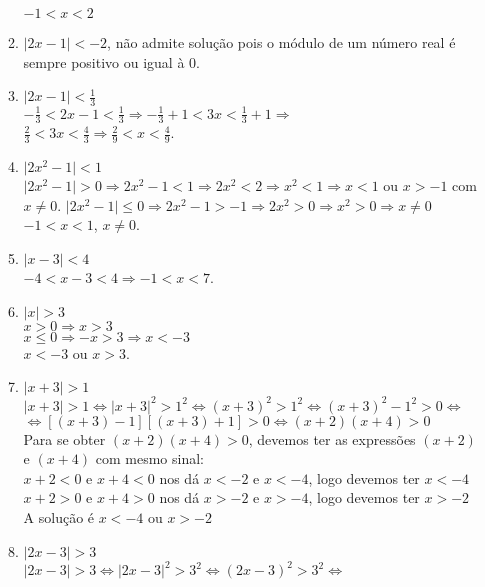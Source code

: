 \begin{enumerate}
\begin{enumerate}
		$-1 < x < 2$
		\item %
		$\vert 2x - 1 \vert < -2$, não admite solução pois o módulo de um número real é sempre positivo ou igual à 0.
		\item %
		$\vert 2x - 1 \vert < \frac{1}{3}$\\
		$-\frac{1}{3} < 2x - 1 < \frac{1}{3} \Rightarrow -\frac{1}{3} + 1 < 3x < \frac{1}{3} + 1 \Rightarrow$\\
		$\frac{2}{3} < 3x < \frac{4}{3} \Rightarrow \frac{2}{9} < x < \frac{4}{9}$.
		\item %
		$\vert 2x^2 - 1 \vert < 1$\\
		$\vert 2x^2 - 1 \vert > 0 \Rightarrow 2x^2 - 1 < 1 \Rightarrow 2x^2 < 2 \Rightarrow x^2 < 1 \Rightarrow x < 1$ ou $x > -1$ com $x \neq 0$.
		$\vert 2x^2 - 1 \vert \leq 0 \Rightarrow 2x^2 - 1 > -1 \Rightarrow 2x^2 > 0 \Rightarrow x^2 > 0 \Rightarrow x \neq 0$\\
		$-1 < x < 1$, $x \neq 0$.
		\item %
		$\vert x - 3 \vert < 4$\\
		$-4 <  x - 3 < 4 \Rightarrow -1 < x < 7$.
		\item %
		$\vert x \vert > 3$\\		
		$x > 0 \Rightarrow x > 3$\\
		$x \leq 0 \Rightarrow -x > 3 \Rightarrow x < -3$\\
		$x < -3$ ou $x > 3$.
		\item %
		$\vert x + 3 \vert > 1$\\
		$\vert x + 3 \vert > 1 \Leftrightarrow \vert x + 3\vert^2 > 1^2  \Leftrightarrow (x+3)^2 > 1^2 \Leftrightarrow (x+3)^2 - 1^2 > 0 \Leftrightarrow$\\
		$\Leftrightarrow [(x+3)-1][(x+3)+1]>0 \Leftrightarrow (x+2)(x+4)>0$\\
		Para se obter $(x+2)(x+4)>0$, devemos ter as expressões $(x+2)$ e $(x+4)$ com mesmo sinal:\\
		$x+2 < 0$ e $ x+4 < 0 $ nos dá $x < -2$ e $x < -4$, logo devemos ter $x < -4$\\
		$x+2 > 0$ e $ x+4 > 0 $ nos dá $x > -2$ e $x > -4$, logo devemos ter $x > -2$\\
		A solução é $x < -4$ ou $x > -2$
		\item %
		$\vert 2x - 3 \vert > 3$\\
		$\vert 2x - 3 \vert > 3 \Leftrightarrow \vert 2x - 3 \vert^2 > 3^2 \Leftrightarrow (2x - 3)^2 > 3^2 \Leftrightarrow $\\

\end{enumerate}
\end{enumerate}
